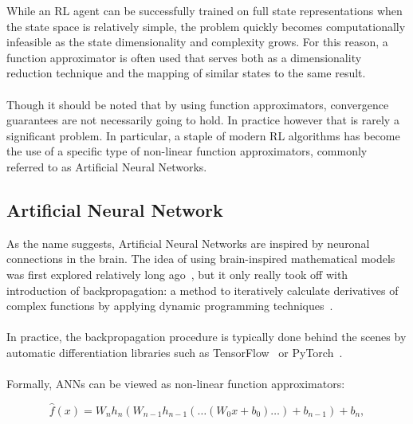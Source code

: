 While an RL agent can be successfully trained on full state representations when the state space is relatively simple, the problem quickly becomes computationally infeasible as the state dimensionality and complexity grows. For this reason, a function approximator is often used that serves both as a dimensionality reduction technique and the mapping of similar states to the same result. 
\\\\
Though it should be noted that by using function approximators, convergence guarantees are not necessarily going to hold. In practice however that is rarely a significant problem. In particular, a staple of modern RL algorithms has become the use of a specific type of non-linear function approximators, commonly referred to as Artificial Neural Networks.

\subsection{Artificial Neural Network}

As the name suggests, Artificial Neural Networks are inspired by neuronal connections in the brain. The idea of using brain-inspired mathematical models was first explored relatively long ago~\cite{McCulloch1943}, but it only really took off with introduction of backpropagation: a method to iteratively calculate derivatives of complex functions by applying dynamic programming techniques~\cite{Rumelhart1986}. 
\\\\
In practice, the backpropagation procedure is typically done behind the scenes by automatic differentiation libraries such as TensorFlow~\cite{Abadi2016} or PyTorch~\cite{Paszke2017}.
\\\\
Formally, ANNs can be viewed as non-linear function approximators:

$${\hat f(x)} = W_nh_n(W_{n-1}h_{n-1}(\dots(W_0x + b_0)\dots) + b_{n-1}) + b_n,$$

